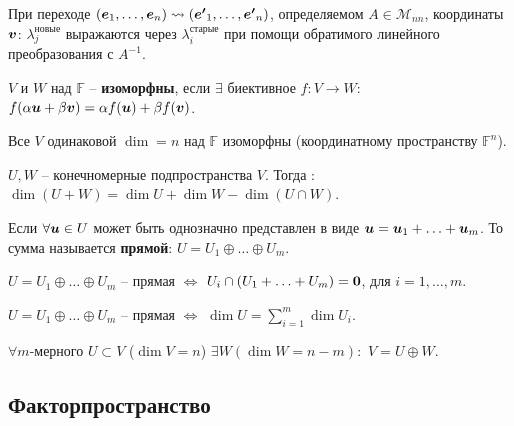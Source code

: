 \begin{to_thr}
	При переходе $(\mbox{\boldmath $e$}_1,\ldots,\mbox{\boldmath $e$}_n) \leadsto ( \mbox{\boldmath $e'$}_1,\ldots,\mbox{\boldmath $e'$}_n)$, определяемом $A \in \mathcal{M}_{n n}$, координаты $\mbox{\boldmath $v$}$: $\lambda_j^\text{новые}$ выражаются через $\lambda_i^\text{старые}$ при помощи обратимого линейного преобразования с $A^{-1}$.
	\label{transition_matrix}
\end{to_thr}

\begin{to_def}
	$V$ и $W$ над $\mathbb{F}$ -- \textbf{изоморфны}, если  $\exists$ биективное $f \colon V \to W:$ $f(\alpha \mbox{\boldmath $u$} + \beta \mbox{\boldmath $v$}) = \alpha f(\mbox{\boldmath $u$}) + \beta f(\mbox{\boldmath $v$})$.
\end{to_def}

\begin{to_thr}
	Все $V$ одинаковой $\dim = n$ над $\mathbb{F}$ изоморфны (координатному пространству $\mathbb{F}^n$).
\end{to_thr}

\begin{to_thr}
	$U, W$ -- конечномерные подпространства $V$. Тогда : $\dim(U + W) = \dim U + \dim W - \dim(U \cap W)$.
\end{to_thr}

\begin{to_def}
	Если $\forall \mbox{\boldmath $u$} \in U$ может быть однозначно представлен в виде $\mbox{\boldmath $u$} = \mbox{\boldmath $u$}_1 + \ldots + \mbox{\boldmath $u$}_m$. То сумма называется \textbf{прямой}: $U = U_1 \oplus \ldots \oplus U_m$.
\end{to_def}

\begin{to_thr}
	$U = U_1 \oplus \ldots \oplus U_m$ -- прямая $\Longleftrightarrow$ $U_i \cap (U_1 + \ldots + U_m) = \mbox{\boldmath $0$}$, для  $i=1, \ldots, m$.
\end{to_thr}

\begin{to_thr}
	$U = U_1 \oplus \ldots \oplus U_m$ -- прямая $\Longleftrightarrow$ $\dim U = \sum\limits_{ i=1 }^{ m } \dim U_i$.
\end{to_thr}

\begin{to_thr}
	$\forall m$-мерного $U \subset V$ ($\dim V = n$) $\exists W (\dim W = n-m):$ $V = U \oplus W$.
\end{to_thr}


\subsection{Факторпространство}

